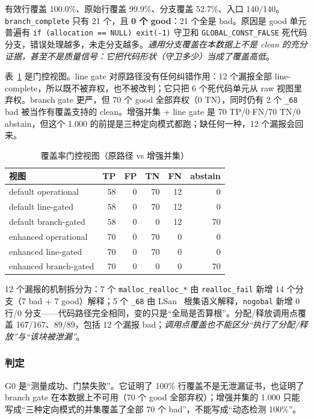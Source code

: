 \documentclass[conference]{IEEEtran}
\begin{document}
有效行覆盖 100.0\%、原始行覆盖 99.9\%、分支覆盖 52.7\%、入口 140/140。\texttt{branch\_complete} 只有 21 个，且 \textbf{0 个 good}：21 个全是 bad。原因是 good 单元普遍有 \texttt{if (allocation == NULL) exit(-1)} 守卫和 \texttt{GLOBAL\_CONST\_FALSE} 死代码分支，错误处理越多，未走分支越多。\emph{通用分支覆盖在本数据上不是 clean 的充分证据，甚至不是质量信号：它把代码形状（守卫多少）当成了覆盖高低}。

表~\ref{tab:covgate} 是门控视图。line gate 对原路径没有任何纠错作用：12 个漏报全部 line-complete，所以既不被弃权，也不被改判；它只把 6 个死代码单元从 raw 视图里弃权。branch gate 更严，但 70 个 good 全部弃权（0 TN），同时仍有 2 个 \texttt{\_68} bad 被当作有覆盖支持的 clean。增强并集 + line gate 是 70 TP/0 FN/70 TN/0 abstain，但这个 1.000 的前提是三种定向模式都跑；缺任何一种，12 个漏报会回来。

\begin{table}[t]
\centering
\caption{覆盖率门控视图（原路径 vs 增强并集）}
\label{tab:covgate}
\footnotesize
\setlength{\tabcolsep}{2.6pt}
\begin{tabular}{@{}lrrrrr@{}}
\toprule
视图 & TP & FP & TN & FN & abstain \\
\midrule
default operational & 58 & 0 & 70 & 12 & 0 \\
default line-gated & 58 & 0 & 70 & 12 & 0 \\
default branch-gated & 58 & 0 & 0 & 12 & 70 \\
enhanced operational & 70 & 0 & 70 & 0 & 0 \\
enhanced line-gated & 70 & 0 & 70 & 0 & 0 \\
enhanced branch-gated & 70 & 0 & 0 & 0 & 70 \\
\bottomrule
\end{tabular}
\end{table}

12 个漏报的机制拆分为：7 个 \texttt{malloc\_realloc\_*} 由 \texttt{realloc\_fail} 新增 14 个分支（7 bad + 7 good）解释；5 个 \texttt{\_68} 由 LSan~\cite{lsan} 根集语义解释，\texttt{nogobal} 新增 0 行/0 分支——代码路径完全相同，变的只是“全局是否算根”。分配/释放调用点覆盖 167/167、89/89，包括 12 个漏报 bad；\emph{调用点覆盖也不能区分“执行了分配/释放”与“该块被泄漏”}。

\subsubsection{判定}

G0 是“测量成功、门禁失败”。它证明了 100\% 行覆盖不是无泄漏证书，也证明了 branch gate 在本数据上不可用（70 个 good 全部弃权）；增强并集的 1.000 只能写成“三种定向模式的并集覆盖了全部 70 个 bad”，不能写成“动态检测 100\%”。
\end{document}
